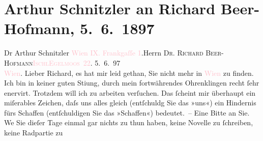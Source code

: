

               \section[Arthur Schnitzler an Richard Beer-Hofmann, 5. 6. 1897]{ Arthur Schnitzler an Richard Beer-Hofmann, 5. 6. 1897}\nopagebreak{}\rehead{ }\normalsize\beginnumbering{} \toendnotes[C]{\smallbreak\pagebreak[2]} 
\toendnotes[C]{\smallbreak}\pstart{}{\pb}Dr Arthur Schnitzler \textcolor{pink}{Wien IX. Frankgaſſe 1}{}\ledrightnote{\textcolor{pink}{Frankgasse}}.\pend{}{\bigskip}\pstart{}{\pb}Herrn \textsc{Dr. Richard
                     Beer-Hofmann}\pend{}\pstart{}\textsc{\textcolor{pink}{Ischl}{}\ledrightnote{\textcolor{pink}{Bad Ischl}}}\pend{}\pstart{}\textcolor{pink}{\textsc{Egelmoos 22}}{}\ledrightnote{\textcolor{pink}{Eglmoosgasse}}.\pend{}{\bigskip}\pstart
           \raggedleft{}{\pb}5. 6. 97{\\}\textcolor{pink}{Wien}{}\ledrightnote{\textcolor{pink}{Wien}}. \pend
           \pstart
           Lieber Richard, es hat mir leid gethan, Sie nicht mehr in \textcolor{pink}{Wien}{}\ledrightnote{\textcolor{pink}{Wien}} zu finden. Ich bin in keiner guten Sti{\geminationm}ung, durch mein fortwährendes Ohrenklingen recht ſehr
               enervirt. Trotzdem will ich zu arbeiten verſuchen. Das ſcheint mir überhaupt ein
               miſerables Zeichen, daſs uns alles gleich (entſchuldg Sie das »uns«) ein Hindernis
               fürs {\pb}Schaffen (entſchuldigen Sie das »Schaffen«)
               bedeutet. – Eine Bitte an Sie. We{\geminationn} Sie dieſer Tage
               einmal gar nichts zu thun haben, keine Novelle zu ſchreiben, keine Radpartie zu
